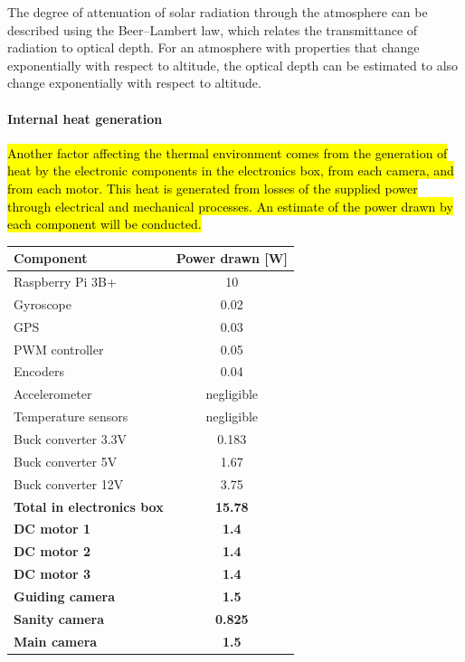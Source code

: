 The degree of attenuation of solar radiation through the atmosphere can be described using the Beer–Lambert law, which relates the transmittance of radiation to optical depth. For an atmosphere with properties that change exponentially with respect to altitude, the optical depth can be estimated to also change exponentially with respect to altitude. \\

\paragraph{Internal heat generation}
\hl{Another factor affecting the thermal environment comes from the generation of heat by the electronic components in the electronics box, from each camera, and from each motor. This heat is generated from losses of the supplied power through electrical and mechanical processes. An estimate of the power drawn by each component will be conducted.} \\

\begin{center}
  \begin{tabular}{ | l | c | }
    \hline
    \textbf{Component} & \textbf{Power drawn [W]}\\ 
    \hline
    Raspberry Pi 3B+  & 10\\
    \hline
    Gyroscope & 0.02\\ 
    \hline
    GPS  & 0.03\\ 
    \hline
    PWM controller & 0.05\\ 
    \hline 
    Encoders  & 0.04 \\ 
    \hline
    Accelerometer  & negligible \\ 
    \hline
    Temperature sensors  & negligible \\ 
    \hline
    Buck converter 3.3V  & 0.183 \\ 
    \hline
    Buck converter 5V  & 1.67 \\ 
    \hline
    Buck converter 12V  & 3.75 \\ 
    \hline
    \textbf{Total in electronics box}  & \textbf{15.78} \\ 
    \hline
    \textbf{DC motor 1}  & \textbf{1.4} \\
    \hline
    \textbf{DC motor 2}  & \textbf{1.4} \\ 
    \hline
    \textbf{DC motor 3}  & \textbf{1.4} \\
    \hline
    \textbf{Guiding camera}  & \textbf{1.5} \\
    \hline
    \textbf{Sanity camera}  & \textbf{0.825} \\ 
    \hline
    \textbf{Main camera}  & \textbf{1.5}\\ 
    \hline
  \end{tabular}
\end{center}

